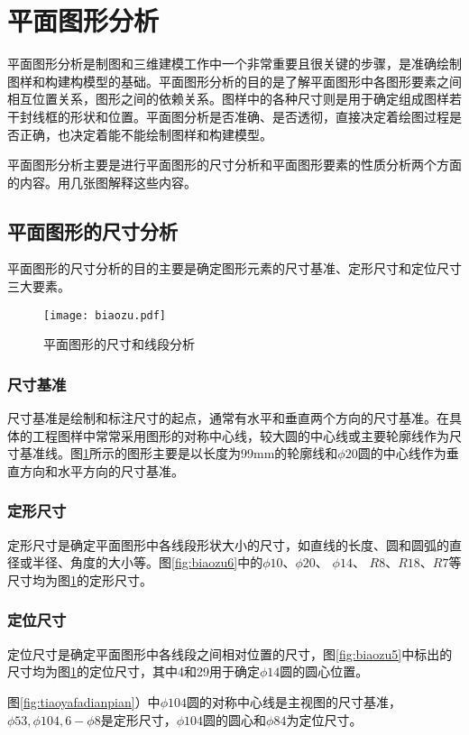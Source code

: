 \section{平面图形分析}
平面图形分析是制图和三维建模工作中一个非常重要且很关键的步骤，是准确绘制图样和构建构模型的基础。平面图形分析的目的是了解平面图形中各图形要素之间相互位置关系，图形之间的依赖关系。图样中的各种尺寸则是用于确定组成图样若干封线框的形状和位置。平面图分析是否准确、是否透彻，直接决定着绘图过程是否正确，也决定着能不能绘制图样和构建模型。

平面图形分析主要是进行平面图形的尺寸分析和平面图形要素的性质分析两个方面的内容。用几张图解释这些内容。

\subsection{平面图形的尺寸分析}
平面图形的尺寸分析的目的主要是确定图形元素的尺寸基准、定形尺寸和定位尺寸三大要素。

\begin{figure}[htbp]
\centering
\texttt{[image: biaozu.pdf]}
\caption{平面图形的尺寸和线段分析} \label{fig:biaozu}
\end{figure}

\subsubsection{尺寸基准} 

尺寸基准是绘制和标注尺寸的起点，通常有水平和垂直两个方向的尺寸基准。在具体的工程图样中常常采用图形的对称中心线，较大圆的中心线或主要轮廓线作为尺寸基准线。图\ref{fig:biaozu}所示的图形主要是以长度为99mm的轮廓线和$\phi 20$圆的中心线作为垂直方向和水平方向的尺寸基准。

\subsubsection{定形尺寸} 

定形尺寸是确定平面图形中各线段形状大小的尺寸，如直线的长度、圆和圆弧的直径或半径、角度的大小等。图\ref{fig:biaozu6}中的$\phi 10$、$\phi 20$、 $\phi 14$、 $R8$、$R18$、$R7$等尺寸均为图\ref{fig:biaozu}的定形尺寸。

\begin{figure}[htbp]
\centering
\begin{floatrow}
\end{floatrow}
\end{figure}

\subsubsection{定位尺寸} 

定位尺寸是确定平面图形中各线段之间相对位置的尺寸，图\ref{fig:biaozu5}中标出的尺寸均为图\ref{fig:biaozu}的定位尺寸，其中4和29用于确定$\phi 14$圆的圆心位置。

图\ref{fig:tiaoyafadianpian}）中$\phi 104$圆的对称中心线是主视图的尺寸基准，$\phi 53,\phi 104,6-\phi 8$是定形尺寸，$\phi 104$圆的圆心和$\phi 84$为定位尺寸。

\endinput